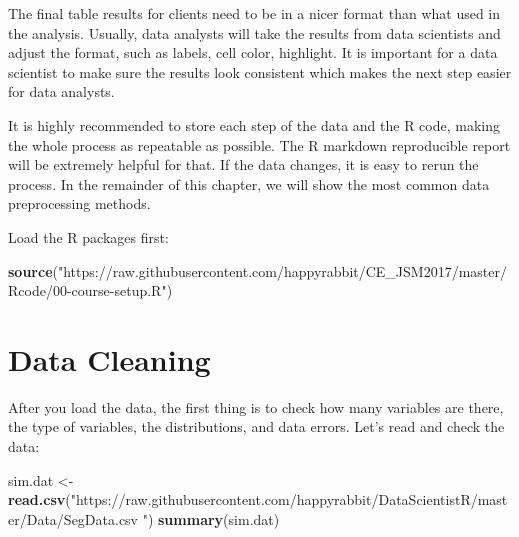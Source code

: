 \documentclass[12pt,]{krantz}
\newenvironment{Shaded}{\begin{snugshade}}{\end{snugshade}}
\newcommand{\KeywordTok}[1]{\textcolor[rgb]{0.13,0.29,0.53}{\textbf{#1}}}
\newcommand{\StringTok}[1]{\textcolor[rgb]{0.31,0.60,0.02}{#1}}
\newcommand{\NormalTok}[1]{#1}
\theoremstyle{definition}
\theoremstyle{definition}
\theoremstyle{definition}
\theoremstyle{remark}
\begin{document}
The final table results for clients need to be in a nicer format than
what used in the analysis. Usually, data analysts will take the results
from data scientists and adjust the format, such as labels, cell color,
highlight. It is important for a data scientist to make sure the results
look consistent which makes the next step easier for data analysts.

It is highly recommended to store each step of the data and the R code,
making the whole process as repeatable as possible. The R markdown
reproducible report will be extremely helpful for that. If the data
changes, it is easy to rerun the process. In the remainder of this
chapter, we will show the most common data preprocessing methods.

Load the R packages first:

\begin{Shaded}
\begin{Highlighting}[]
\KeywordTok{source}\NormalTok{(}\StringTok{"https://raw.githubusercontent.com/happyrabbit/CE_JSM2017/master/Rcode/00-course-setup.R"}\NormalTok{)}
\end{Highlighting}
\end{Shaded}

\section{Data Cleaning}\label{data-cleaning}

After you load the data, the first thing is to check how many variables
are there, the type of variables, the distributions, and data errors.
Let's read and check the data:

\begin{Shaded}
\begin{Highlighting}[]
\NormalTok{sim.dat <-}\StringTok{ }\KeywordTok{read.csv}\NormalTok{(}\StringTok{"https://raw.githubusercontent.com/happyrabbit/DataScientistR/master/Data/SegData.csv "}\NormalTok{)}
\KeywordTok{summary}\NormalTok{(sim.dat)}
\end{Highlighting}
\end{Shaded}
\end{document}
